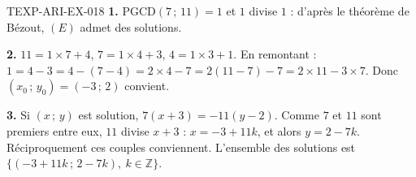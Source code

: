 \begin{corrige}{TEXP-ARI-EX-018}
\textbf{1.} $\mathrm{PGCD}(7\,;\,11)=1$ et $1$ divise $1$ : d'après le
théorème de Bézout, $(E)$ admet des solutions.

\textbf{2.} $11=1\times7+4$, $7=1\times4+3$, $4=1\times3+1$. En remontant :
$1=4-3=4-(7-4)=2\times4-7=2(11-7)-7=2\times11-3\times7$. Donc
$(x_0\,;\,y_0)=(-3\,;\,2)$ convient.

\textbf{3.} Si $(x\,;\,y)$ est solution, $7(x+3)=-11(y-2)$. Comme $7$ et $11$
sont premiers entre eux, $11$ divise $x+3$ : $x=-3+11k$, et alors $y=2-7k$.
Réciproquement ces couples conviennent. L'ensemble des solutions est
$\{(-3+11k\,;\,2-7k),\ k\in\mathbb{Z}\}$.
\end{corrige}
